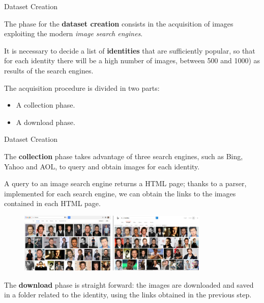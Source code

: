 \begin{tframe}{Dataset Creation}

The phase for the \textbf{dataset creation} consists in the acquisition of images exploiting the modern \textit{image search engines}.

\vspace{0.1in}

It is necessary to decide a list of \textbf{identities} that are sufficiently popular, so that for each identity there will be a high number of images, between 500 and 1000) as results of the search engines.

\vspace{0.1in}

The acquisition procedure is divided in two parts: 

\begin{itemize}
\item A collection phase.
\item A download phase.
\end{itemize}

\end{tframe}

\begin{tframe}{Dataset Creation}

The \textbf{collection} phase takes advantage of three search engines, such as Bing, Yahoo and AOL, to query and obtain images for each identity.

\vspace{0.1in}

A query to an image search engine returns a HTML page; thanks to a parser, implemented for each search engine, we can obtain the links to the images contained in each HTML page.

\begin{figure}[h]
\centering
\hspace*{\fill}
\includegraphics[width=0.40\textwidth]{images/image8.png}
\hspace*{\fill}
\includegraphics[width=0.40\textwidth]{images/image11.png}
\hspace*{\fill}
\end{figure}


The \textbf{download} phase is straight forward: the images are downloaded and saved in a folder related to the identity, using the links obtained in the previous step.

\end{tframe}